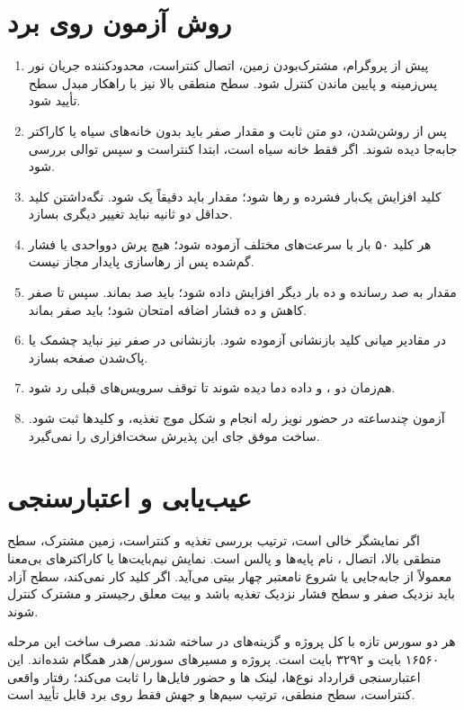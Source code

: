 \section{روش آزمون روی برد}
\begin{enumerate}
  \item پیش از پروگرام، مشترک‌بودن زمین، اتصال کنتراست، محدودکننده جریان نور پس‌زمینه و پایین ماندن  کنترل شود. سطح منطقی بالا نیز با راهکار مبدل سطح تأیید شود.
  \item پس از روشن‌شدن، دو متن ثابت و مقدار صفر باید بدون خانه‌های سیاه یا کاراکتر جابه‌جا دیده شوند. اگر فقط خانه سیاه است، ابتدا کنتراست و سپس توالی  بررسی شود.
  \item کلید افزایش یک‌بار فشرده و رها شود؛ مقدار باید دقیقاً یک شود. نگه‌داشتن کلید حداقل دو ثانیه نباید تغییر دیگری بسازد.
  \item هر کلید ۵۰ بار با سرعت‌های مختلف آزموده شود؛ هیچ پرش دوواحدی یا فشار گم‌شده پس از رهاسازی پایدار مجاز نیست.
  \item مقدار به صد رسانده و ده بار دیگر افزایش داده شود؛ باید صد بماند. سپس تا صفر کاهش و ده فشار اضافه امتحان شود؛ باید صفر بماند.
  \item در مقادیر میانی کلید بازنشانی آزموده شود. بازنشانی در صفر نیز نباید چشمک یا پاک‌شدن صفحه بسازد.
  \item هم‌زمان دو ،  و داده دما دیده شوند تا توقف سرویس‌های قبلی رد شود.
  \item آزمون چندساعته در حضور نویز رله انجام و شکل موج تغذیه،  و کلیدها ثبت شود. ساخت موفق جای این پذیرش سخت‌افزاری را نمی‌گیرد.
\end{enumerate}

\section{عیب‌یابی و اعتبارسنجی}
اگر نمایشگر خالی است، ترتیب بررسی تغذیه و کنتراست، زمین مشترک، سطح منطقی بالا، اتصال ، نام پایه‌ها و پالس  است. نمایش نیم‌بایت‌ها یا کاراکترهای بی‌معنا معمولاً از جابه‌جایی  یا شروع نامعتبر چهار بیتی می‌آید. اگر کلید کار نمی‌کند، سطح آزاد باید نزدیک صفر و سطح فشار نزدیک تغذیه باشد و بیت معلق رجیستر  و  مشترک کنترل شوند.

هر دو سورس تازه با کل پروژه و گزینه‌های
در  ساخته شدند. مصرف ساخت این مرحله ۱۶۵۶۰ بایت  و ۳۲۹۲ بایت  است.  پروژه  و مسیرهای سورس/هدر همگام شده‌اند. این اعتبارسنجی قرارداد نوع‌ها، لینک ها و حضور فایل‌ها را ثابت می‌کند؛ رفتار واقعی کنتراست، سطح منطقی، ترتیب سیم‌ها و جهش فقط روی برد قابل تأیید است.

